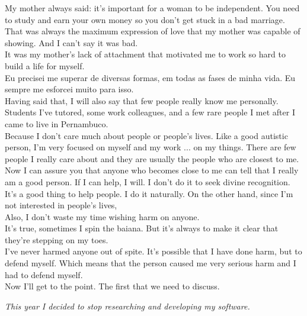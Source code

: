 \documentclass[11pt]{book}
\begin{document}
\noindent My mother always said: it's important for a woman to be independent. You need to study and earn your own money so you don't get stuck in a bad marriage. That was always the maximum expression of love that my mother was capable of showing. And I can't say it was bad. \\

\noindent It was my mother's lack of attachment that motivated me to work so hard to build a life for myself. \\

\noindent Eu precisei me superar de diversas formas, em todas as fases de minha vida. Eu sempre me esforcei muito para isso. \\

\noindent Having said that, I will also say that few people really know me personally. Students I've tutored, some work colleagues, and a few rare people I met after I came to live in Pernambuco. \\

\noindent Because I don't care much about people or people's lives. Like a good autistic person, I'm very focused on myself and my work ... on my things. There are few people I really care about and they are usually the people who are closest to me. \\

\noindent Now I can assure you that anyone who becomes close to me can tell that I really am a good person. If I can help, I will. I don't do it to seek divine recognition. It's a good thing to help people. I do it naturally. On the other hand, since I'm not interested in people's lives, \\ 

\noindent Also, I don't waste my time wishing harm on anyone. \\

\noindent It's true, sometimes I spin the baiana. But it's always to make it clear that they're stepping on my toes. \\

\noindent I've never harmed anyone out of spite. It's possible that I have done harm, but to defend myself. Which means that the person caused me very serious harm and I had to defend myself. \\

\noindent Now I'll get to the point. The first that we need to discuss.

\noindent \begin{center} \emph{This year I decided to stop researching and developing my software.} \end{center}
\end{document}
